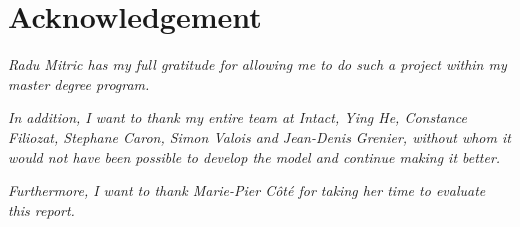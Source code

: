 \section*{Acknowledgement}
\begin{center}
	\vspace{8cm}
	
	\textit{Radu Mitric has my full gratitude for allowing me to do such a project within my master degree program.} \\
	\vspace{0.5cm}
	
	\textit{In addition, I want to thank my entire team at Intact, Ying He, Constance Filiozat, Stephane Caron, Simon Valois and Jean-Denis Grenier, without whom it would not have been possible to develop the model and continue making it better.}
	\vspace{0.5cm}
	
	\textit{Furthermore, I want to thank Marie-Pier Côté for taking her time to evaluate this report.}
\end{center}